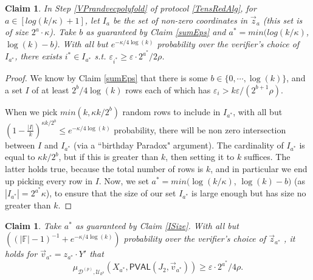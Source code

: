 \documentclass[11pt]{article}
\newtheorem{claim}[theorem]{Claim}
\newcommand{\PVAL}{\mathsf{PVAL}}
\newcommand{\F}{\mathbb{F}}
\begin{document}
\begingroup
\def\thetheorem{\ref{ISize}}
\begin{claim}
In Step \ref{VPrandvecpolyfold} of protocol \ref{TensRedAlg}, for $a \in [log(k/\kappa) + 1]$, let $I_{a}$ be the set of non-zero coordinates in $\vec{z}_{a}$ (this set is of size $2^{a}\cdot \kappa$). Take $b$ as guaranteed by Claim \ref{sumEps} and $a^{\ast} = min(log(k/\kappa)$, $\log (k) - b$). With all but $e^{-\kappa/4 \log (k)}$ probability over the verifier’s choice of $I_{a^{\ast}}$, there exists $i^{\ast} \in I_{a^{\ast}}$ s.t. $\varepsilon_{i^{\ast}} \geq \varepsilon \cdot 2^{a^{\ast}}/2\rho$.
\end{claim}
\addtocounter{theorem}{-1}
\endgroup
\begin{proof}
We know by Claim \ref{sumEps} that there is some $b\in\{0,\cdots, \log (k)\}$, and a set $I$ of at least $2^{b}/4 \log (k)$ rows each of which has $\varepsilon_{i}>k\varepsilon/(2^{b+1}\rho)$.

When we pick $min(k, \kappa k/2^{b})$ random rows to include in $I_{a^{\ast}}$, with all but $\left( 1-\frac{\vert I\vert }{k} \right)^{\kappa k/2^{b}}\leq e^{-\kappa/4\log (k)}$ probability, there will be non zero intersection between $I$ and $I_{a^{\ast}}$ (via a ``birthday Paradox" argument). The cardinality of $I_{a^{\ast}}$ is equal to $\kappa k/2^{b}$, but if this is greater than $k$, then setting it to $k$ suffices. The latter holds true, because the total number of rows is $k$, and in particular we end up picking every row in $I$. Now, we set $a^{\ast} = min(\log(k/\kappa)$, $\log (k) - b)$ (as $|I_{a^{\ast}}|=2^{a^{\ast}}\kappa$), to ensure that the size of our set $I_{a^{\ast}}$ is large enough but has size no greater than $k$.
\end{proof}
\begingroup
\def\thetheorem{\ref{TensRedSound}}
\begin{claim}
Take $a^{\ast}$ as guaranteed by Claim \ref{ISize}. With all but $((\vert \F\vert -1)^{-1}+e^{-\kappa/4 \log (k)} )$ probability over the verifier’s choice of $\vec{z}_{a^{\ast}}$ , it holds for $\vec{v}_{a^{\ast}}=z_{a^{\ast}}\cdot Y'$ that 
\begin{equation*}
    \mu_{\mathcal{D}^{(p)},\mathcal{U}_{k^{p}}}(X_{a^{\ast}},\PVAL(J_{2},\vec{v}_{a^{\ast}}))\geq \varepsilon\cdot2^{a^{\ast}}/4\rho.
\end{equation*}
\end{claim}
\addtocounter{theorem}{-1}
\endgroup
\end{document}

